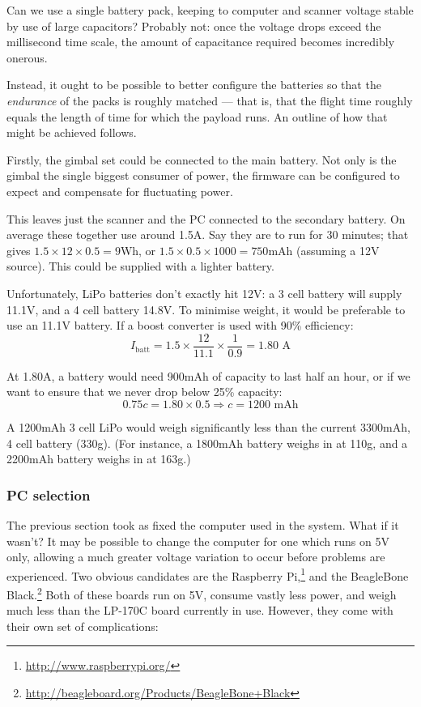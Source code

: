 \documentclass[12pt,oneside,a4paper]{book}
\begin{document}
Can we use a single battery pack, keeping to computer and scanner
voltage stable by use of large capacitors? Probably not: once the
voltage drops exceed the millisecond time scale, the amount of
capacitance required becomes incredibly onerous.

Instead, it ought to be possible to better configure the batteries so
that the \emph{endurance} of the packs is roughly matched --- that is,
that the flight time roughly equals the length of time for which the
payload runs. An outline of how that might be achieved follows.

Firstly, the gimbal set could be connected to the main battery. Not
only is the gimbal the single biggest consumer of power, the firmware
can be configured to expect and compensate for fluctuating power.

This leaves just the scanner and the PC connected to the secondary
battery. On average these together use around 1.5A.  Say they are to
run for 30 minutes; that gives $1.5 \times 12 \times 0.5 = 9$Wh, or
$1.5 \times 0.5 \times 1000 = 750$mAh (assuming a 12V source). This
could be supplied with a lighter battery.

Unfortunately, LiPo batteries don't exactly hit 12V: a 3 cell battery
will supply 11.1V, and a 4 cell battery 14.8V. To minimise weight, it
would be preferable to use an 11.1V battery. If a boost converter is
used with 90\% efficiency:
\begin{equation}
  \label{eq:2}
  I_{\text{batt}} = 1.5 \times \frac{12}{11.1} \times \frac{1}{0.9} =
  1.80 \text{ A}
\end{equation}

At 1.80A, a battery would need 900mAh of capacity to last half an
hour, or if we want to ensure that we never drop below 25\% capacity:
\begin{equation}
  \label{eq:3}
  0.75c = 1.80 \times 0.5 \Rightarrow c = 1200 \text{ mAh}
\end{equation}

A 1200mAh 3 cell LiPo would weigh significantly less than the current
3300mAh, 4 cell battery (330g). (For instance, a 1800mAh battery weighs
in at 110g, and a 2200mAh battery weighs in at 163g.)

\subsubsection{PC selection}
\label{sec:electr-gener}

The previous section took as fixed the computer used in the
system. What if it wasn't? It may be possible to change the computer
for one which runs on 5V only, allowing a much greater voltage
variation to occur before problems are experienced. Two obvious
candidates are the Raspberry
Pi,\footnote{\url{http://www.raspberrypi.org/}} and the BeagleBone
Black.\footnote{\url{http://beagleboard.org/Products/BeagleBone+Black}}
Both of these boards run on 5V, consume vastly less power, and weigh
much less than the LP-170C board currently in use. However, they come
with their own set of complications:
\end{document}
